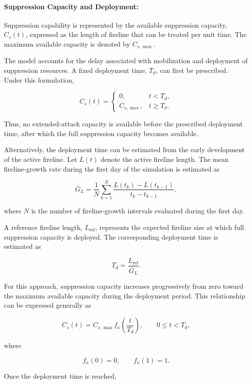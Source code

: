 \paragraph{Suppression Capacity and Deployment:}

Suppression capability is represented by the available suppression capacity,
$C_s(t)$, expressed as the length of fireline that can be treated per unit time.
The maximum available capacity is denoted by $C_{s,\max}$.

The model accounts for the delay associated with mobilization and deployment of
suppression resources. A fixed deployment time, $T_d$, can first be prescribed.
Under this formulation,

\[
C_s(t)
=
\begin{cases}
0, & t<T_d, \\[4pt]
C_{s,\max}, & t\geq T_d.
\end{cases}
\]

Thus, no extended-attack capacity is available before the prescribed deployment
time, after which the full suppression capacity becomes available.

Alternatively, the deployment time can be estimated from the early development
of the active fireline. Let $L(t)$ denote the active fireline length. The mean
fireline-growth rate during the first day of the simulation is estimated as

\[
\overline{G}_L
=
\frac{1}{N}
\sum_{k=1}^{N}
\frac{L(t_k)-L(t_{k-1})}
     {t_k-t_{k-1}},
\]

where $N$ is the number of fireline-growth intervals evaluated during the first
day.

A reference fireline length, $L_{\mathrm{ref}}$, represents the expected
fireline size at which full suppression capacity is deployed. The corresponding
deployment time is estimated as

\[
T_d
=
\frac{L_{\mathrm{ref}}}
     {\overline{G}_L}.
\]

For this approach, suppression capacity increases progressively from zero toward
the maximum available capacity during the deployment period. This relationship
can be expressed generally as

\[
C_s(t)
=
C_{s,\max}
f_{\kappa}
\left(
\frac{t}{T_d}
\right),
\qquad
0 \leq t<T_d,
\]

where

\[
f_{\kappa}(0)=0,
\qquad
f_{\kappa}(1)=1.
\]

Once the deployment time is reached,

